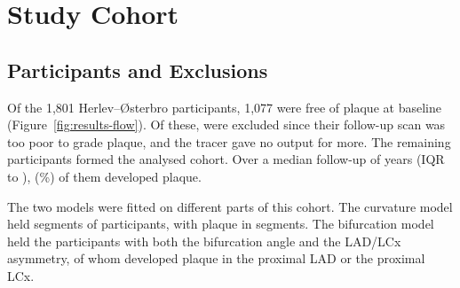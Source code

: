 \section{Study Cohort}
\label{sec:results-cohort}

\subsection{Participants and Exclusions}
\label{sec:results-flow}

Of the 1,801 Herlev--{\O}sterbro participants, 1,077 were free of plaque at baseline (Figure~\ref{fig:results-flow}).
Of these,  were excluded since their follow-up scan was too poor to grade plaque, and the tracer gave no output for  more.
The remaining  participants formed the analysed cohort.
Over a median follow-up of  years (IQR  to ),  (\%) of them developed plaque.

The two models were fitted on different parts of this cohort.
The curvature model held  segments of  participants, with plaque in  segments.
The bifurcation model held the  participants with both the bifurcation angle and the LAD/LCx asymmetry, of whom  developed plaque in the proximal LAD or the proximal LCx.

